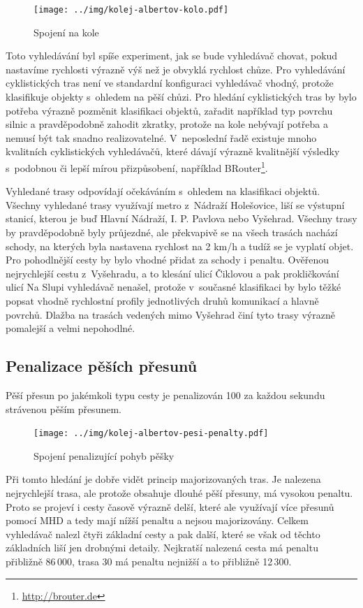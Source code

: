 \begin{figure}[h]
  \centering
    \texttt{[image: ../img/kolej-albertov-kolo.pdf]}
  \caption{Spojení na kole}
  \label{fig:kolej-albertov-kolo}
\end{figure}

Toto vyhledávání byl spíše experiment, jak se bude vyhledávač chovat, pokud
nastavíme rychlosti výrazně výš než je obvyklá rychlost chůze. Pro vyhledávání
cyklistických tras není ve standardní konfiguraci vyhledávač vhodný, protože
klasifikuje objekty s~ohledem na pěší chůzi. Pro hledání cyklistických tras by
bylo potřeba výrazně pozměnit klasifikaci objektů, zařadit například typ povrchu
silnic a pravděpodobně zahodit zkratky, protože na kole nebývají potřeba a
nemusí být tak snadno realizovatelné. V~neposlední řadě existuje mnoho
kvalitních cyklistických vyhledávačů, které dávají výrazně kvalitnější výsledky
s~podobnou či lepší mírou přizpůsobení, například
BRouter\footnote{\url{http://brouter.de}}.

Vyhledané trasy odpovídají očekáváním s~ohledem na klasifikaci objektů. Všechny
vyhledané trasy využívají metro z~Nádraží Holešovice, liší se výstupní stanicí,
kterou je buď Hlavní Nádraží, I. P. Pavlova nebo Vyšehrad. Všechny trasy by
pravděpodobně byly průjezdné, ale překvapivě se na všech trasách nachází schody,
na kterých byla nastavena rychlost na 2 km/h a tudíž se je vyplatí objet. Pro
pohodlnější cesty by bylo vhodné přidat za schody i penaltu. Ověřenou
nejrychlejší cestu z~Vyšehradu, a to klesání ulicí Čiklovou a pak prokličkování
ulicí Na Slupi vyhledávač nenašel, protože v~současné klasifikaci by bylo těžké
popsat vhodně rychlostní profily jednotlivých druhů komunikací a hlavně povrchů.
Dlažba na trasách vedených mimo Vyšehrad činí tyto trasy výrazně pomalejší a
velmi nepohodlné.

\subsection{Penalizace pěších přesunů}
Pěší přesun po jakémkoli typu cesty je penalizován 100 za každou sekundu
strávenou pěším přesunem.

\begin{figure}[h]
  \centering
    \texttt{[image: ../img/kolej-albertov-pesi-penalty.pdf]}
  \caption{Spojení penalizující pohyb pěšky}
  \label{fig:kolej-albertov-pesi-penalty}
\end{figure}

Při tomto hledání je dobře vidět princip majorizovaných tras. Je nalezena
nejrychlejší trasa, ale protože obsahuje dlouhé pěší přesuny, má vysokou
penaltu. Proto se projeví i cesty časově výrazně delší, které ale využívají více
přesunů pomocí MHD a tedy mají nížší penaltu a nejsou majorizovány. Celkem
vyhledávač nalezl čtyři základní cesty a pak další, které se však od těchto
základních liší jen drobnými detaily. Nejkratší nalezená cesta má penaltu
přibližně 86\,000, trasa 30 má penaltu nejnižší a to přibližně 12\,300. 

